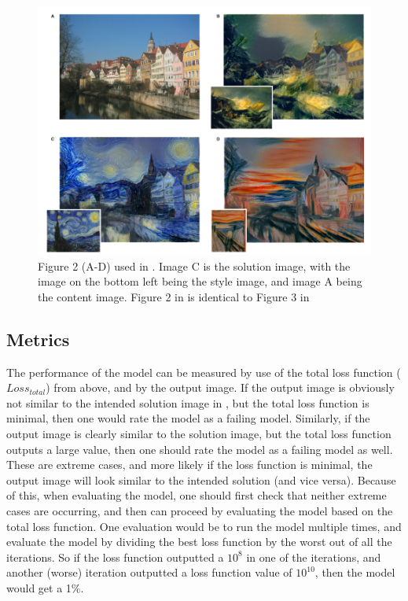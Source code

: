\documentclass[12pt]{article}
\begin{document}
\begin{figure}
\centering
\includegraphics[totalheight=8cm]{Figure2.png}
    \caption{Figure 2 (A-D) used in \cite{Neural}. Image C is the solution image, with the image on the bottom left being the style image, and image A being the content image. Figure 2 in \cite{Neural} is identical to Figure 3 in \cite{Image}}
    \label{fig:solution}
\end{figure}

\subsection{Metrics}
The performance of the model can be measured by use of the total loss function ($Loss_{total}$) from above, and by the output image. If the output image is obviously not similar to the intended solution image in \cite{Neural, Image}, but the total loss function is minimal, then one would rate the model as a failing model. Similarly, if the output image is clearly similar to the solution image, but the total loss function outputs a large value, then one should rate the model as a failing model as well. These are extreme cases, and more likely if the loss function is minimal, the output image will look similar to the intended solution (and vice versa). Because of this, when evaluating the model, one should first check that neither extreme cases are occurring, and then can proceed by evaluating the model based on the total loss function. One evaluation would be to run the model multiple times, and evaluate the model by dividing the best loss function by the worst out of all the iterations. So if the loss function outputted a $10^8$ in one of the iterations, and another (worse) iteration outputted a loss function value of $10^{10}$, then the model would get a 1\%. 
\end{document}
